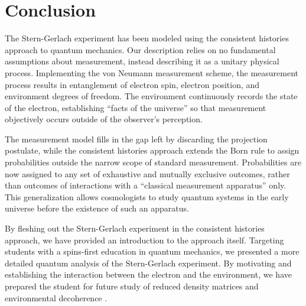 \chapter{Conclusion}
The Stern-Gerlach experiment has been modeled using the consistent histories approach to quantum mechanics. Our description relies on no fundamental assumptions about measurement, instead describing it as a unitary physical process. Implementing the von Neumann measurement scheme, the measurement process results in entanglement of electron spin, electron position, and environment degrees of freedom. The environment continuously records the state of the electron, establishing ``facts of the universe'' so that measurement objectively occurs outside of the observer's perception.

The measurement model fills in the gap left by discarding the projection postulate, while the consistent histories approach extends the Born rule to assign probabilities outside the narrow scope of standard measurement. Probabilities are now assigned to any set of exhaustive and mutually exclusive outcomes, rather than outcomes of interactions with a ``classical measurement apparatus'' only. This generalization allows cosmologists to study quantum systems in the early universe before the existence of such an apparatus.

By fleshing out the Stern-Gerlach experiment in the consistent histories approach, we have provided an introduction to the approach itself. Targeting students with a spins-first education in quantum mechanics, we presented a more detailed quantum analysis of the Stern-Gerlach experiment. By motivating and establishing the interaction between the electron and the environment, we have prepared the student for future study of reduced density matrices and environmental decoherence \cite{Schlosshauer}.

{}


